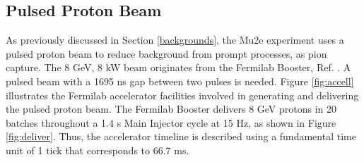 \subsection{Pulsed Proton Beam}\label{pulsedprotonbeam}
As previously discussed in Section  \ref{backgrounds}, the Mu2e experiment uses a 
pulsed proton beam to reduce background from prompt processes, as pion capture. 
The 8 GeV, 8 kW beam originates from the Fermilab Booster, Ref. \cite{PhysRevAccelBeams.20.111003}. 
A pulsed beam with a 1695 ns gap between two pulses is needed. Figure \ref{fig:accell} 
illustrates the Fermilab accelerator facilities involved in generating and delivering 
the pulsed proton beam. The Fermilab Booster delivers 8 GeV protons in 20 batches 
throughout a 1.4 s Main Injector cycle at 15 Hz, as shown in Figure \ref{fig:deliver}. 
Thus, the accelerator timeline is described using a fundamental time unit of 1 tick that corresponds to 66.7 ms.


